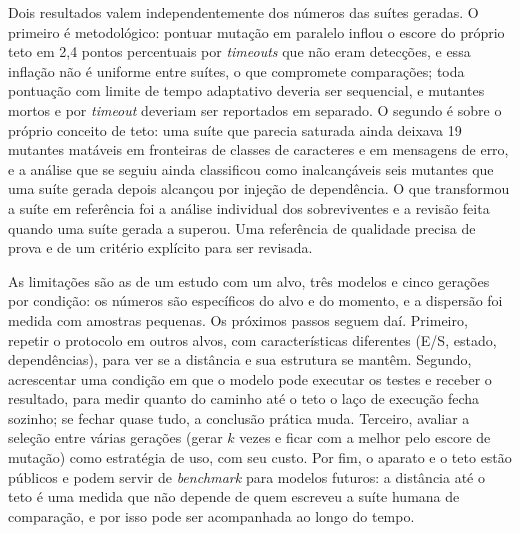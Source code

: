 Dois resultados valem independentemente dos números das suítes geradas. O primeiro é metodológico: pontuar mutação em paralelo inflou o escore do próprio teto em 2,4 pontos percentuais por \textit{timeouts} que não eram detecções, e essa inflação não é uniforme entre suítes, o que compromete comparações; toda pontuação com limite de tempo adaptativo deveria ser sequencial, e mutantes mortos e por \textit{timeout} deveriam ser reportados em separado. O segundo é sobre o próprio conceito de teto: uma suíte que parecia saturada ainda deixava 19 mutantes matáveis em fronteiras de classes de caracteres e em mensagens de erro, e a análise que se seguiu ainda classificou como inalcançáveis seis mutantes que uma suíte gerada depois alcançou por injeção de dependência. O que transformou a suíte em referência foi a análise individual dos sobreviventes e a revisão feita quando uma suíte gerada a superou. Uma referência de qualidade precisa de prova e de um critério explícito para ser revisada.

As limitações são as de um estudo com um alvo, três modelos e cinco gerações por condição: os números são específicos do alvo e do momento, e a dispersão foi medida com amostras pequenas. Os próximos passos seguem daí. Primeiro, repetir o protocolo em outros alvos, com características diferentes (E/S, estado, dependências), para ver se a distância e sua estrutura se mantêm. Segundo, acrescentar uma condição em que o modelo pode executar os testes e receber o resultado, para medir quanto do caminho até o teto o laço de execução fecha sozinho; se fechar quase tudo, a conclusão prática muda. Terceiro, avaliar a seleção entre várias gerações (gerar $k$ vezes e ficar com a melhor pelo escore de mutação) como estratégia de uso, com seu custo. Por fim, o aparato e o teto estão públicos e podem servir de \textit{benchmark} para modelos futuros: a distância até o teto é uma medida que não depende de quem escreveu a suíte humana de comparação, e por isso pode ser acompanhada ao longo do tempo.
